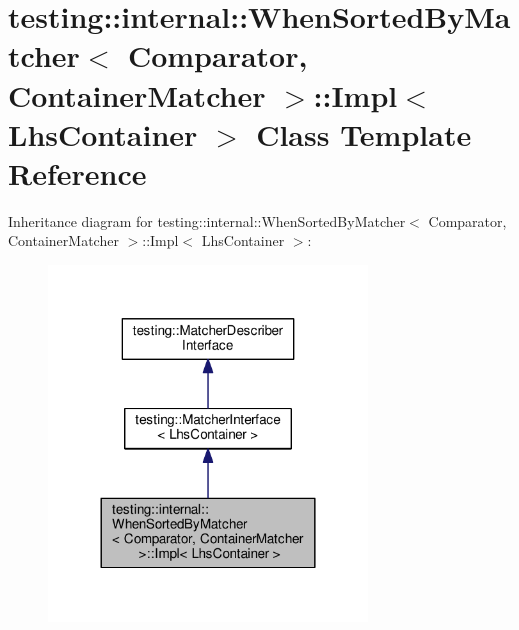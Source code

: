 \hypertarget{classtesting_1_1internal_1_1WhenSortedByMatcher_1_1Impl}{}\section{testing\+:\+:internal\+:\+:When\+Sorted\+By\+Matcher$<$ Comparator, Container\+Matcher $>$\+:\+:Impl$<$ Lhs\+Container $>$ Class Template Reference}
\label{classtesting_1_1internal_1_1WhenSortedByMatcher_1_1Impl}


Inheritance diagram for testing\+:\+:internal\+:\+:When\+Sorted\+By\+Matcher$<$ Comparator, Container\+Matcher $>$\+:\+:Impl$<$ Lhs\+Container $>$\+:\nopagebreak
\begin{figure}[H]
\begin{center}
\leavevmode
\includegraphics[width=240pt]{classtesting_1_1internal_1_1WhenSortedByMatcher_1_1Impl__inherit__graph}
\end{center}
\end{figure}


